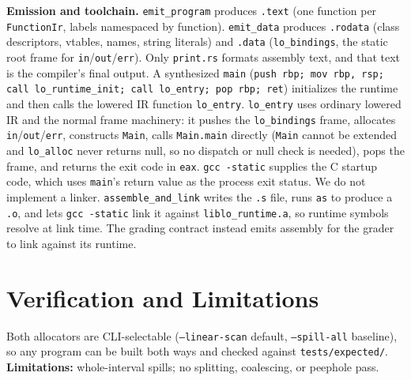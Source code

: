 \documentclass[10pt]{article}
\newcommand{\code}[1]{\texttt{\small #1}}
\begin{document}
\textbf{Emission and toolchain.} \code{emit\_program} produces \code{.text} (one function per \code{FunctionIr}, labels namespaced by function). \code{emit\_data} produces \code{.rodata} (class descriptors, vtables, names, string literals) and \code{.data} (\code{lo\_bindings}, the static root frame for \code{in}/\code{out}/\code{err}). Only \code{print.rs} formats assembly text, and that text is the compiler's final output. A synthesized \code{main} (\code{push rbp; mov rbp, rsp; call lo\_runtime\_init; call lo\_entry; pop rbp; ret}) initializes the runtime and then calls the lowered IR function \code{lo\_entry}. \code{lo\_entry} uses ordinary lowered IR and the normal frame machinery: it pushes the \code{lo\_bindings} frame, allocates \code{in}/\code{out}/\code{err}, constructs \code{Main}, calls \code{Main.main} directly (\code{Main} cannot be extended and \code{lo\_alloc} never returns null, so no dispatch or null check is needed), pops the frame, and returns the exit code in \code{eax}. \code{gcc -static} supplies the C startup code, which uses \code{main}'s return value as the process exit status. We do not implement a linker. \code{assemble\_and\_link} writes the \code{.s} file, runs \code{as} to produce a \code{.o}, and lets \code{gcc -static} link it against \code{liblo\_runtime.a}, so runtime symbols resolve at link time. The grading contract instead emits assembly for the grader to link against its runtime.

\section{Verification and Limitations}
Both allocators are CLI-selectable (\code{--linear-scan} default, \code{--spill-all} baseline), so any program can be built both ways and checked against \code{tests/expected/}. \textbf{Limitations:} whole-interval spills; no splitting, coalescing, or peephole pass.
\end{document}
